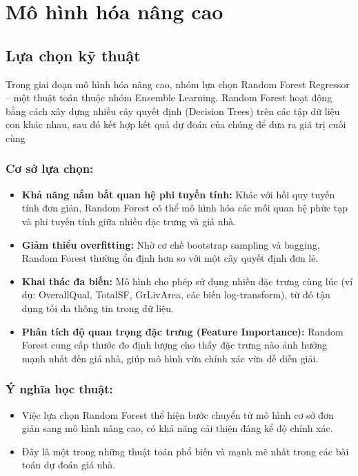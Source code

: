 \clearpage
\section{Mô hình hóa nâng cao}
\subsection{Lựa chọn kỹ thuật}
Trong giai đoạn mô hình hóa nâng cao, nhóm lựa chọn Random Forest Regressor – một thuật toán thuộc nhóm Ensemble Learning. Random Forest hoạt động bằng cách xây dựng nhiều cây quyết định (Decision Trees) trên các tập dữ liệu con khác nhau, sau đó kết hợp kết quả dự đoán của chúng để đưa ra giá trị cuối cùng
\subsubsection{Cơ sở lựa chọn:}
\begin{itemize}
  \item[-] \textbf{Khả năng nắm bắt quan hệ phi tuyến tính:} Khác với hồi quy tuyến tính đơn giản, Random Forest có thể mô hình hóa các mối quan hệ phức tạp và phi tuyến tính giữa nhiều đặc trưng và giá nhà.
  \item[-] \textbf{Giảm thiểu overfitting:} Nhờ cơ chế bootstrap sampling và bagging, Random Forest thường ổn định hơn so với một cây quyết định đơn lẻ.
  \item[-] \textbf{Khai thác đa biến:} Mô hình cho phép sử dụng nhiều đặc trưng cùng lúc (ví dụ: OverallQual, TotalSF, GrLivArea, các biến log-transform), từ đó tận dụng tối đa thông tin trong dữ liệu.
  \item[-] \textbf{Phân tích độ quan trọng đặc trưng (Feature Importance):} Random Forest cung cấp thước đo định lượng cho thấy đặc trưng nào ảnh hưởng mạnh nhất đến giá nhà, giúp mô hình vừa chính xác vừa dễ diễn giải.
\end{itemize}
\subsubsection{Ý nghĩa học thuật:}
\begin{itemize}
  \item[-] Việc lựa chọn Random Forest thể hiện bước chuyển từ mô hình cơ sở đơn giản sang mô hình nâng cao, có khả năng cải thiện đáng kể độ chính xác.
  \item[-] Đây là một trong những thuật toán phổ biến và mạnh mẽ nhất trong các bài toán dự đoán giá nhà.
\end{itemize}

